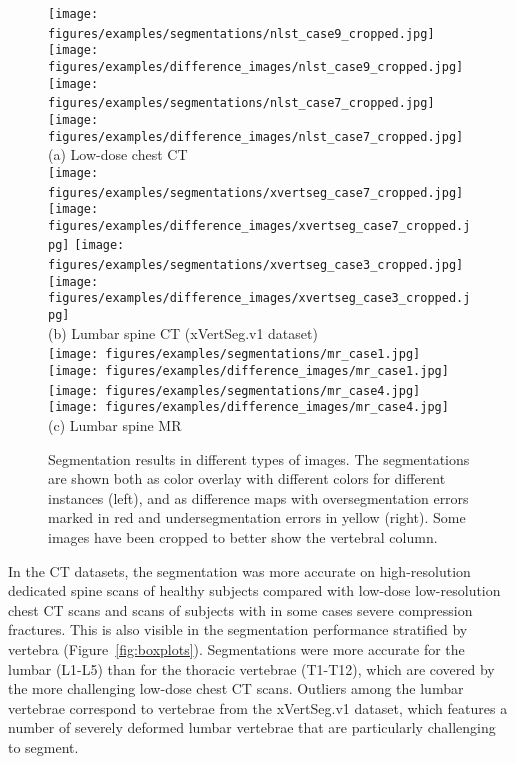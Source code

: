 \documentclass[authoryear,5p,final,times]{elsarticle}
\begin{document}
	\begin{figure*}
		\centering
		\scriptsize
		\texttt{[image: figures/examples/segmentations/nlst\_case9\_cropped.jpg]}%
		\,%
		\texttt{[image: figures/examples/difference\_images/nlst\_case9\_cropped.jpg]}%
		\hfill%
		\texttt{[image: figures/examples/segmentations/nlst\_case7\_cropped.jpg]}%
		\,%
		\texttt{[image: figures/examples/difference\_images/nlst\_case7\_cropped.jpg]}%
		\\[0.25em]
		(a) Low-dose chest CT
		\\[1em]
		\texttt{[image: figures/examples/segmentations/xvertseg\_case7\_cropped.jpg]}%
		\,%
		\texttt{[image: figures/examples/difference\_images/xvertseg\_case7\_cropped.jpg]}%
		\hfill%
		\texttt{[image: figures/examples/segmentations/xvertseg\_case3\_cropped.jpg]}%
		\,%
		\texttt{[image: figures/examples/difference\_images/xvertseg\_case3\_cropped.jpg]}%
		\\[0.25em]
		(b) Lumbar spine CT (xVertSeg.v1 dataset)
		\\[1em]%
		\texttt{[image: figures/examples/segmentations/mr\_case1.jpg]}%
		\,%
		\texttt{[image: figures/examples/difference\_images/mr\_case1.jpg]}%
		\hfill%
		\texttt{[image: figures/examples/segmentations/mr\_case4.jpg]}%
		\,%
		\texttt{[image: figures/examples/difference\_images/mr\_case4.jpg]}%
		\\[0.25em]
		(c) Lumbar spine MR
		\caption{Segmentation results in different types of images. The segmentations are shown both as color overlay with different colors for different instances (left), and as difference maps with oversegmentation errors marked in red and undersegmentation errors in yellow (right). Some images have been cropped to better show the vertebral column.}
		\label{fig:examples_differences}
	\end{figure*}
	
	In the CT datasets, the segmentation was more accurate on high-resolution dedicated spine scans of healthy subjects compared with low-dose low-resolution chest CT scans and scans of subjects with in some cases severe compression fractures. This is also visible in the segmentation performance stratified by vertebra (Figure~\ref*{fig:boxplots}). Segmentations were more accurate for the lumbar (L1-L5) than for the thoracic vertebrae (T1-T12), which are covered by the more challenging low-dose chest CT scans. Outliers among the lumbar vertebrae correspond to vertebrae from the xVertSeg.v1 dataset, which features a number of severely deformed lumbar vertebrae that are particularly challenging to segment.
	
\end{document}
